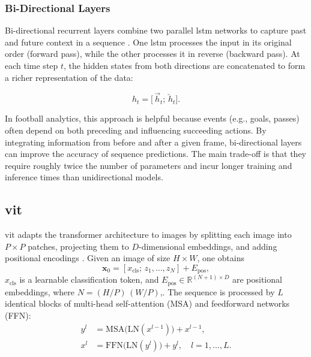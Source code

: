 \subsubsection{Bi-Directional Layers}
\label{ssec:bi_directional_layers}

Bi-directional recurrent layers combine two parallel \acrshort{lstm} networks to capture past and future context in a sequence \cite{radhakrishnan_bi_lstm_2023, bhogal_human_2023}. One \acrshort{lstm} processes the input in its original order (forward pass), while the other processes it in reverse (backward pass). At each time step \(t\), the hidden states from both directions are concatenated to form a richer representation of the data:

\[
h_t = \bigl[\,\overrightarrow{h}_t;\,\overleftarrow{h}_t\bigr].
\]

In football analytics, this approach is helpful because events (e.g., goals, passes) often depend on both preceding and influencing succeeding actions. By integrating information from before and after a given frame, bi-directional layers can improve the accuracy of sequence predictions. The main trade-off is that they require roughly twice the number of parameters and incur longer training and inference times than unidirectional models.


\subsection{\acrfull{vit}}
\label{ssec:vision_transformers}

\acrlong{vit} adapts the transformer architecture \cite{vaswani_attention_2017} 
to images by splitting each image into $P\times P$ patches, projecting them to $D$-dimensional embeddings, and adding positional encodings \cite{dosovitskiy_image_transformer_2021}. Given an image of size $H\times W$, one obtains
\[
\mathbf{x}_0 = [x_{\text{cls}};\,z_1,\dots,z_N] + E_{\text{pos}},
\]
$x_{\text{cls}}$ is a learnable classification token, and $E_{\text{pos}}\in\mathbb{R}^{(N+1)\times D}$ are positional embeddings, where $N=(H/P)\,(W/P)$,. The sequence is processed by $L$ identical blocks of multi-head self-attention (MSA) and feedforward networks (FFN)\cite{dosovitskiy_image_transformer_2021}:
\begin{align*}
y^l &= \mathrm{MSA}\bigl(\mathrm{LN}(x^{l-1})\bigr) + x^{l-1},\\
x^l &= \mathrm{FFN}\bigl(\mathrm{LN}(y^l)\bigr) + y^l,\quad l=1,\dots,L.
\end{align*}

